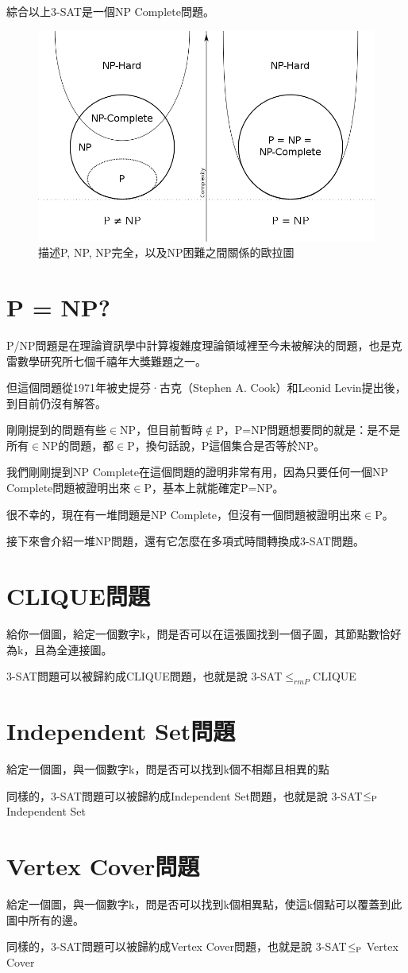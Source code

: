 \documentclass{article}
\begin{document}
綜合以上3-SAT是一個NP Complete問題。

\begin{figure}[h]
\includegraphics[width=\textwidth]{PNP.png}
\caption{描述P, NP, NP完全，以及NP困難之間關係的歐拉圖}
\end{figure}

\section{P = NP?}

P/NP問題是在理論資訊學中計算複雜度理論領域裡至今未被解決的問題，也是克雷數學研究所七個千禧年大獎難題之一。

但這個問題從1971年被史提芬·古克（Stephen A. Cook）和Leonid Levin提出後，到目前仍沒有解答。

剛剛提到的問題有些$\in$NP，但目前暫時$\not\in$P，P=NP問題想要問的就是：是不是所有$\in$NP的問題，都$\in$P，換句話說，P這個集合是否等於NP。

我們剛剛提到NP Complete在這個問題的證明非常有用，因為只要任何一個NP Complete問題被證明出來$\in$P，基本上就能確定P=NP。

很不幸的，現在有一堆問題是NP Complete，但沒有一個問題被證明出來$\in$P。

接下來會介紹一堆NP問題，還有它怎麼在多項式時間轉換成3-SAT問題。


\section{CLIQUE問題}
給你一個圖，給定一個數字k，問是否可以在這張圖找到一個子圖，其節點數恰好為k，且為全連接圖。

3-SAT問題可以被歸約成CLIQUE問題，也就是說 3-SAT$\leq _{rm P}$CLIQUE

\section{Independent Set問題}
給定一個圖，與一個數字k，問是否可以找到k個不相鄰且相異的點

同樣的，3-SAT問題可以被歸約成Independent Set問題，也就是說 3-SAT$\leq _{\rm P}$ Independent Set

\section{Vertex Cover問題}
給定一個圖，與一個數字k，問是否可以找到k個相異點，使這k個點可以覆蓋到此圖中所有的邊。

同樣的，3-SAT問題可以被歸約成Vertex Cover問題，也就是說 3-SAT$\leq _{\rm P}$ Vertex Cover
\end{document}
